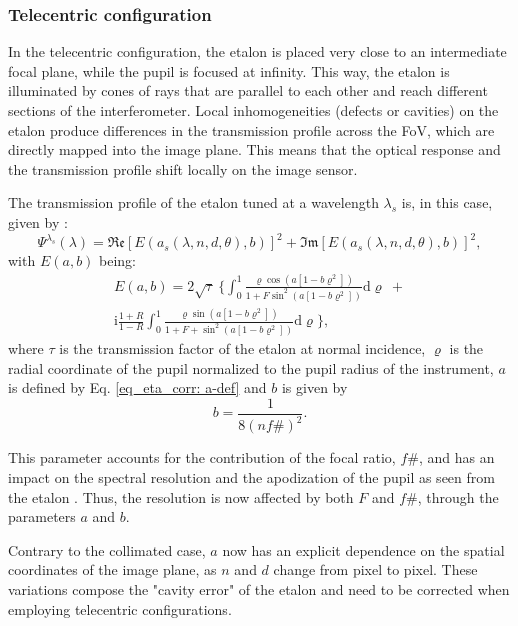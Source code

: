 \subsubsection{\label{eta_corr_susec: Tele-perfe}Telecentric configuration}

In the telecentric configuration, the etalon is placed very close to an intermediate focal plane, while the pupil is focused at infinity. This way, the etalon is illuminated by cones of rays that are parallel to each other and reach different sections of the interferometer. Local inhomogeneities (defects or cavities) on the etalon produce differences in the transmission profile across the FoV, which are directly mapped into the image plane. This means that the optical response and the transmission profile shift locally on the image sensor. 

The transmission profile of the etalon tuned at a wavelength $\lambda _s $ is, in this case, given by \citep{franIV}:
\begin{equation}
\Psi ^{\lambda _ s} (\lambda) =  \mathfrak{Re}\left[E(a_s (\lambda, n, d, \theta), b) \right] ^2 + \mathfrak{Im}\left[E(a_s(\lambda, n, d, \theta), b) \right] ^2 ,
\label{Eqn: Tel_first}
\end{equation}
with $E(a,b)$ being:
\begin{multline}
E(a, b) = 2 \sqrt{\tau}\ \Biggl\{ \int_0^1 \frac{\varrho \cos \left(a\left[1-b \varrho^2\right]\right)}{1+F \sin ^2\left(a\left[1-b \varrho^2\right]\right)} \mathrm{d} \varrho \ + \\
\mathrm{i} \frac{1+R}{1-R} \int_0^1 \frac{\varrho \sin \left(a\left[1-b \varrho^2\right]\right)}{1+F+ \sin ^2\left(a\left[1-b \varrho^2\right]\right)} \mathrm{d} \varrho\Biggr\} ,
\end{multline}
where $\tau$ is the transmission factor of the etalon at normal incidence, $\varrho$ is the radial coordinate of the pupil normalized to the pupil radius of the instrument, $a$ is defined by Eq. \eqref{eq_eta_corr: a-def} and $b$ is given by
\begin{equation}
b = \frac{1}{8 (nf\#) ^2}.
\end{equation}

This parameter accounts for the contribution of the focal ratio, $f\#$, and has an impact on the spectral resolution and the apodization of the pupil as seen from the etalon \citep{beckers}. Thus, the resolution is now affected by both $F$ and $f\#$, through the parameters $a$ and $b$.

Contrary to the collimated case, $a$ now has an explicit dependence on the spatial coordinates of the image plane, as $n$ and $d$ change from pixel to pixel. These variations compose the "cavity error" of the etalon and need to be corrected when employing telecentric configurations.

